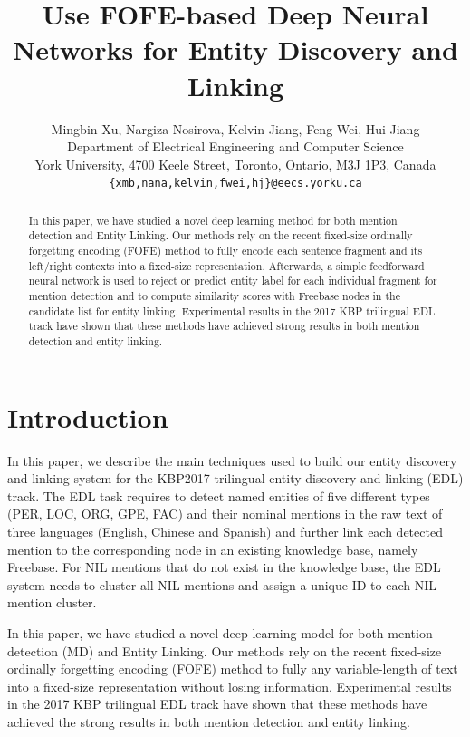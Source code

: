 \documentclass[11pt]{article}
\title{Use FOFE-based Deep Neural Networks for Entity Discovery and Linking}
\author{Mingbin Xu, Nargiza Nosirova, Kelvin Jiang, Feng Wei, Hui Jiang \\
	Department of Electrical Engineering and Computer Science \\
	York University,  4700 Keele Street, Toronto, Ontario, M3J 1P3, Canada\\
	{\tt \{xmb,nana,kelvin,fwei,hj\}@eecs.yorku.ca}
}
\date{}
\begin{document}
\maketitle

\begin{abstract}
In this paper, we have studied a novel deep learning method for both mention detection and Entity Linking. Our methods rely on the recent fixed-size ordinally forgetting encoding (FOFE) method to fully encode each sentence fragment and its left/right contexts into a fixed-size representation. Afterwards, a simple feedforward neural network is used to reject or predict entity label for each individual fragment for mention detection and to compute similarity scores with Freebase nodes in the candidate list for entity linking. Experimental results in the 2017 KBP trilingual EDL track have shown that these methods have achieved strong results in both mention detection and entity linking.
\end{abstract}

\section{Introduction}

In this paper, we describe the main techniques used to build our entity discovery and linking system for the KBP2017 trilingual entity discovery and linking (EDL) track. 
The EDL task requires to detect named
entities of five different types (PER, LOC, ORG, GPE, FAC) 
and their nominal mentions in the raw text
of three languages (English, Chinese and Spanish)
and further link each detected mention to the corresponding
node in an existing knowledge base,
namely Freebase. For NIL mentions that do not exist
in the knowledge base, the EDL system needs to
cluster all NIL mentions and assign a unique ID to
each NIL mention cluster.

In this paper, we have studied a novel deep learning model for both mention detection (MD) and Entity Linking. Our methods rely on the recent fixed-size ordinally forgetting encoding (FOFE) method to fully any variable-length of text into a fixed-size representation without losing information. 
Experimental results in the 2017 KBP trilingual EDL track have shown that these methods have achieved the strong results in both mention detection and entity linking.
\end{document}
